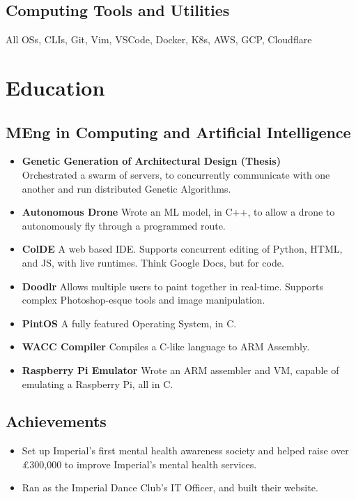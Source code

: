 \documentclass{jcgcv}
\begin{document}
\begin{column}
  \subsection{Computing Tools and Utilities}
  \hspace{1em}All OSs, CLIs, Git, Vim, VSCode, Docker, K8s, AWS, GCP, Cloudflare

\vspace{1em}
\section{Education}
  \vspace{0.5em}
  \subsection{MEng in Computing and Artificial Intelligence}
  \begin{itemize}
    \item \textbf{Genetic Generation of Architectural Design (Thesis)} \\
          Orchestrated a swarm of servers, to concurrently communicate with
          one another and run distributed Genetic Algorithms.
    \item \textbf{Autonomous Drone} Wrote an ML model, in C++, to allow a drone
          to autonomously fly through a programmed route.
    \item \textbf{ColDE} A web based IDE. Supports concurrent editing of Python,
          HTML, and JS, with live runtimes. Think Google Docs, but for code.
    \item \textbf{Doodlr} Allows multiple users to paint together in real-time. Supports
          complex Photoshop-esque tools and image manipulation.
    \item \textbf{PintOS} A fully featured Operating System, in C.
    \item \textbf{WACC Compiler} Compiles a C-like language to ARM Assembly.
    \item \textbf{Raspberry Pi Emulator} Wrote an ARM assembler and VM, capable
          of emulating a Raspberry Pi, all in C.
  \end{itemize}

  \subsection{Achievements}
  \begin{itemize}
    \item Set up Imperial's first mental health awareness society and helped
          raise over \pounds300,000 to improve Imperial's mental health services.
    \item Ran as the Imperial Dance Club's IT Officer, and built their website.
  \end{itemize}


\end{column}
\end{document}
